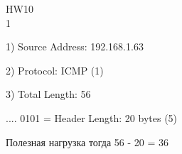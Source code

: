 \documentclass[a4paper,11pt]{article}
\begin{document}
\Large
HW10
\\
1

\begin{center}
\label{fig:image}
\end{center}
1) Source Address: 192.168.1.63

2) Protocol: ICMP (1)

3) Total Length: 56

.... 0101 = Header Length: 20 bytes (5)

Полезная нагрузка тогда 56 - 20 = 36

\begin{center}
\label{fig:image}
\end{center}
\end{document}
